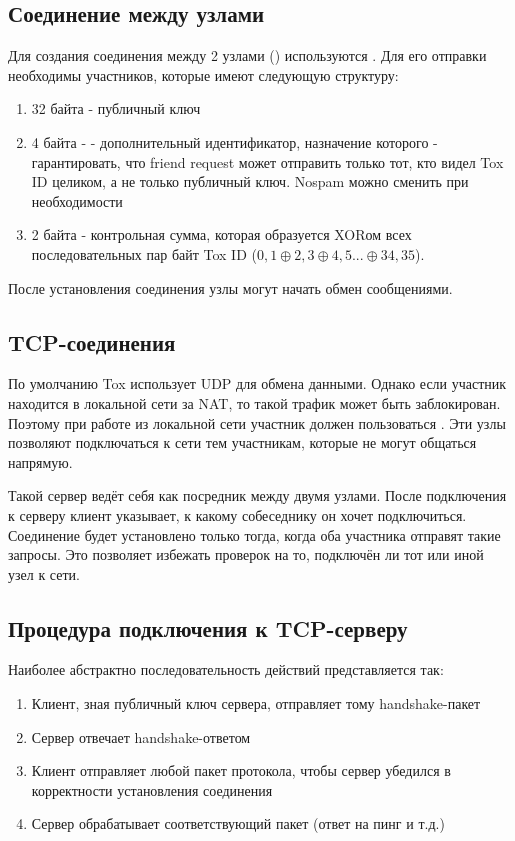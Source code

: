 \documentclass{/home/fresheed/utils/latex/university-templates/lab-report}
\begin{document}
\subsection{Соединение между узлами}

Для создания соединения между 2 узлами () используются . Для его отправки необходимы  участников, которые имеют следующую структуру:

\begin{enumerate}
\item 32 байта - публичный ключ
\item 4 байта -  - дополнительный идентификатор, назначение которого - гарантировать, что friend request может отправить только тот, кто видел Tox ID целиком, а не только публичный ключ. Nospam можно сменить при необходимости
\item 2 байта - контрольная сумма, которая образуется XORом всех последовательных пар байт Tox ID ($0,1 \oplus 2,3 \oplus  4,5 ... \oplus  34,35$).
\end{enumerate}

После установления соединения узлы могут начать обмен сообщениями.


\subsection{TCP-соединения}

По умолчанию Tox использует UDP для обмена данными. Однако если участник находится в локальной сети за NAT, то такой трафик может быть заблокирован. Поэтому при работе из локальной сети участник должен пользоваться . Эти узлы позволяют подключаться к сети тем участникам, которые не могут общаться напрямую.

Такой сервер ведёт себя как посредник между двумя узлами. После подключения к серверу клиент указывает, к какому собеседнику он хочет подключиться. Соединение будет установлено только тогда, когда оба участника отправят такие запросы. Это позволяет избежать проверок на то, подключён ли тот или иной узел к сети.

\subsection{Процедура подключения к TCP-серверу}

Наиболее абстрактно последовательность действий представляется так:

\begin{enumerate}
\item Клиент, зная публичный ключ сервера, отправляет тому handshake-пакет
\item Сервер отвечает handshake-ответом
\item Клиент отправляет любой пакет протокола, чтобы сервер убедился в корректности установления соединения
\item Сервер обрабатывает соответствующий пакет (ответ на пинг и т.д.)
\end{enumerate}
\end{document}
